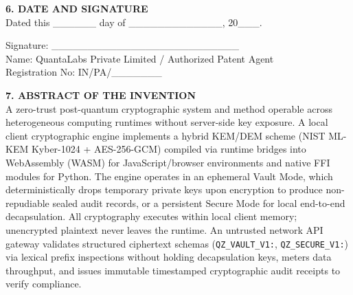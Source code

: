 \documentclass[12pt, a4paper]{article}
\begin{document}
\vspace{3em}
\noindent \textbf{6. DATE AND SIGNATURE} \\
Dated this \_\_\_\_\_\_ day of \_\_\_\_\_\_\_\_\_\_\_\_\_, 20\_\_\_.

\vspace{3em}
\noindent Signature: \_\_\_\_\_\_\_\_\_\_\_\_\_\_\_\_\_\_\_\_\_\_\_\_\_\_ \\
Name: QuantaLabs Private Limited / Authorized Patent Agent \\
Registration No: IN/PA/\_\_\_\_\_\_\_

\newpage
\noindent \textbf{7. ABSTRACT OF THE INVENTION} \\
A zero-trust post-quantum cryptographic system and method operable across heterogeneous computing runtimes without server-side key exposure. A local client cryptographic engine implements a hybrid KEM/DEM scheme (NIST ML-KEM Kyber-1024 + AES-256-GCM) compiled via runtime bridges into WebAssembly (WASM) for JavaScript/browser environments and native FFI modules for Python. The engine operates in an ephemeral Vault Mode, which deterministically drops temporary private keys upon encryption to produce non-repudiable sealed audit records, or a persistent Secure Mode for local end-to-end decapsulation. All cryptography executes within local client memory; unencrypted plaintext never leaves the runtime. An untrusted network API gateway validates structured ciphertext schemas (\texttt{QZ\_VAULT\_V1:}, \texttt{QZ\_SECURE\_V1:}) via lexical prefix inspections without holding decapsulation keys, meters data throughput, and issues immutable timestamped cryptographic audit receipts to verify compliance.
\end{document}
